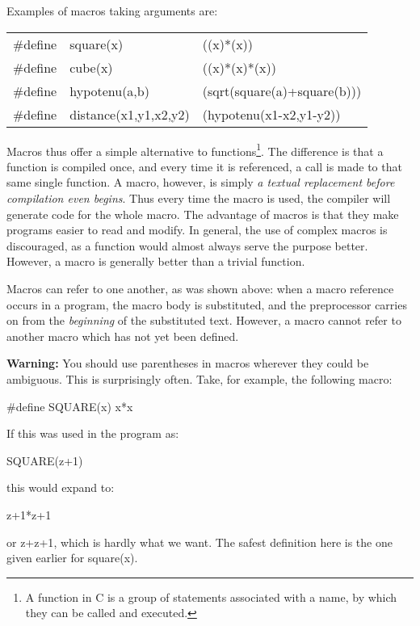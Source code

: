 Examples of macros taking arguments are:
\begin{display}\cd
\begin{tabular}{@{}lll@{}}   
 \#define  &  square(x)             &  ((x)*(x)) \\
 \#define  &  cube(x)               &  ((x)*(x)*(x)) \\
 \#define  &  hypotenu(a,b)         &   (sqrt(square(a)+square(b))) \\
 \#define  &  distance(x1,y1,x2,y2) &   (hypotenu(x1-x2,y1-y2)) 
\end{tabular}
\end{display}
\noindent
 Macros thus  offer a  simple alternative  to functions\footnote{A
function in C is a group of statements associated with a name, by
which they can be called and executed.}. The difference is that a 
function is  compiled once, and every time it is referenced, a call is
made to  that same  single function.  A macro,  however, is simply
{\em a textual replacement before compilation even  begins\/}. Thus 
every time the macro is used, the compiler will generate code  for
the  whole macro. 
The advantage of macros is that they  make
programs  easier to  read and  modify. In  general, the use of
complex macros  is discouraged,  as a  function would  almost always
serve the purpose better. However, a macro is generally better than a
trivial function.

Macros can  refer to  one another,  as was  shown  above:  when  a 
macro reference occurs  in a  program,  the  macro  body  is 
substituted,  and  the preprocessor carries on from the
{\em beginning\/} of the substituted text. However, a macro cannot refer to
another macro which has not yet been defined.

{\bf Warning:} You  should use  parentheses in  macros wherever 
they could  be ambiguous. This is surprisingly often. Take, for
example, the following macro:
\begin{code}
\#define  SQUARE(x) \tab  x*x
\end{code}
\noindent
If this was used in the program as:
\begin{code}
SQUARE(z+1)
\end{code}
\noindent
this would expand to:
\begin{code}
z+1*z+1
\end{code}
\noindent
or {\cd z+z+1}, which is hardly what we want. The safest definition here is
the one given earlier for {\cd square(x)}.

